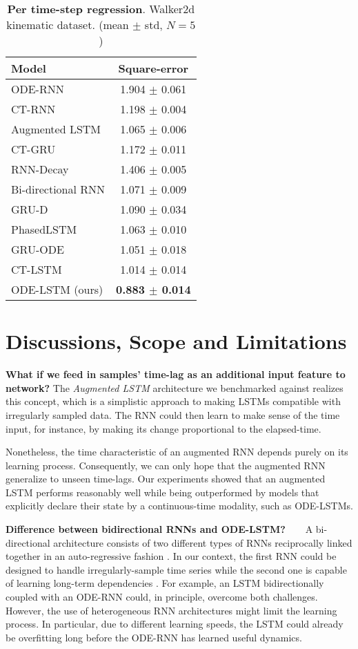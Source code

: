 \documentclass{article}
\makeatletter
\def\adl@drawiv#1#2#3{\hskip.5\tabcolsep
    \xleaders#3{#2.5\@tempdimb #1{1}#2.5\@tempdimb}#2\z@ plus1fil minus1fil\relax
    \hskip.5\tabcolsep}
\newcommand{\cdashlinelr}[1]{\noalign{\vskip\aboverulesep
        \global\let\@dashdrawstore\adl@draw
        \global\let\adl@draw\adl@drawiv}
    \cdashline{#1}
    \noalign{\global\let\adl@draw\@dashdrawstore
        \vskip\belowrulesep}}
\makeatother
\begin{document}
\begin{table}[H]
\vspace{-4mm}
    \centering
     \caption{\textbf{Per time-step regression}. Walker2d kinematic dataset. (mean $\pm$ std, $N=5$)}
     \begin{tabular}{lc}
     \toprule
     Model & Square-error \\
\hline
ODE-RNN & 1.904 $\pm$ 0.061 \\
CT-RNN & 1.198 $\pm$ 0.004 \\
Augmented LSTM & 1.065 $\pm$ 0.006 \\
CT-GRU & 1.172 $\pm$ 0.011 \\
RNN-Decay & 1.406 $\pm$ 0.005 \\
Bi-directional RNN & 1.071 $\pm$ 0.009 \\
GRU-D & 1.090 $\pm$ 0.034 \\
PhasedLSTM & 1.063 $\pm$ 0.010 \\
GRU-ODE & 1.051 $\pm$ 0.018 \\
CT-LSTM & 1.014 $\pm$ 0.014 \\
     \cdashlinelr{1-2} 
ODE-LSTM (ours) & \textbf{0.883 $\pm$ 0.014} \\
     \bottomrule
     \end{tabular}
 \label{tab:real_walker}
\end{table}






\section{Discussions, Scope and Limitations}
\textbf{What if we feed in samples' time-lag as an additional input feature to network?} The \textit{Augmented LSTM} architecture we benchmarked against realizes this concept, which is a simplistic approach to making LSTMs compatible with irregularly sampled data. The RNN could then learn to make sense of the time input, for instance, by making its change proportional to the elapsed-time. 

Nonetheless, the time characteristic of an augmented RNN depends purely on its learning process. Consequently, we can only hope that the augmented RNN generalize to unseen time-lags. Our experiments showed that an augmented LSTM performs reasonably well while being outperformed by models that explicitly declare their state by a continuous-time modality, such as ODE-LSTMs.

\textbf{Difference between bidirectional RNNs and ODE-LSTM?~~~} 
A bi-directional architecture consists of two different types of RNNs reciprocally linked together in an auto-regressive fashion \cite{schuster1997bidirectional}. In our context, the first RNN could be designed to handle irregularly-sample time series while the second one is capable of learning long-term dependencies \cite{cao2018brits}. For example, an LSTM bidirectionally coupled with an ODE-RNN could, in principle, overcome both challenges. However, the use of heterogeneous RNN architectures might limit the learning process. In particular, due to different learning speeds, the LSTM could already be overfitting long before the ODE-RNN has learned useful dynamics. 
\end{document}

